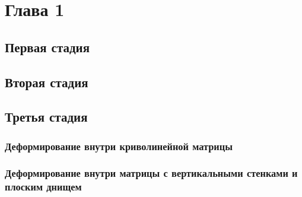 \chapter{Глава 1}
\section{Первая стадия}
\section{Вторая стадия}
\section{Третья стадия}
	\subsection{Деформирование внутри криволинейной матрицы}
	\subsection{Деформирование внутри матрицы с вертикальными стенками и плоским днищем}
